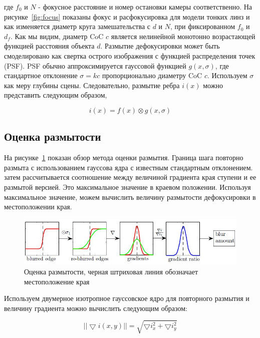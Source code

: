 где $f_0$ и $N$ - фокусное расстояние и номер остановки камеры соответственно. На рисунке~\ref{fig:focus} показаны фокус и расфокусировка для модели тонких линз и как изменяется диаметр круга замешательства с $d$ и $N$, при фиксированном $f_0$ и $d_f$.
Как мы видим, диаметр CoC $c$ является нелинейной монотонно возрастающей функцией расстояния объекта $d$. Размытие дефокусировки может быть смоделировано как свертка острого изображения с функцией распределения точек (PSF). PSF обычно аппроксимируется гауссовой функцией $g(x,\sigma)$, где стандартное отклонение $\sigma=kc$ пропорционально диаметру CoC $c$. Используем $\sigma$ как меру глубины сцены. Следовательно, размытие ребра $i(x)$ можно представить следующим образом,

\begin{equation}\label{eq:3}
i(x)=f(x)\otimes g(x,\sigma)
\end{equation}

\subsection{Оценка размытости}

На рисунке~\ref{fig:blur} показан обзор метода оценки размытия. Граница шага повторно размыта с использованием гауссова ядра с известным стандартным отклонением. затем рассчитывается соотношение между величиной градиента края ступени и ее размытой версией. Это максимальное значение в краевом положении. Используя максимальное значение, можем вычислить величину размытости дефокусировки в местоположении края.

\begin{figure}[H]
	\centering
	\includegraphics[width=1\linewidth]{pics/blur}
	\caption{Оценка размытости, черная штриховая линия обозначает местоположение края}
	\label{fig:blur}
\end{figure}

Используем двумерное изотропное гауссовское ядро для повторного размытия и величину градиента можно вычислить следующим образом:

\begin{equation}\label{eq:4}
||\bigtriangledown i(x,y)||=\sqrt{\bigtriangledown i_x^2+\bigtriangledown i_y^2}
\end{equation}

